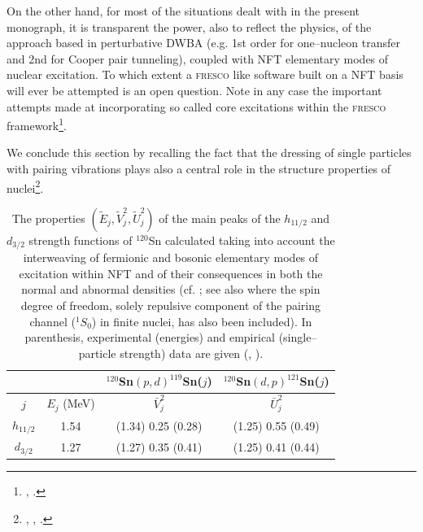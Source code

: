   
  On the other hand, for most of the situations dealt with in the present monograph, it is transparent the power, also to reflect the physics, of the approach based in perturbative DWBA (e.g. 1st order for one--nucleon transfer and 2nd for Cooper pair tunneling), coupled  
  with NFT elementary modes of nuclear excitation.
  To which extent a \textsc{fresco} like software built on a NFT basis will ever be attempted is an open question. Note in any case the important attempts made at incorporating so called core excitations within the \textsc{fresco} framework\footnote{\cite{Fernandez:10}, \cite{Fernandez:10b}.}. 
  
  
  We conclude this section by recalling the fact that the dressing of single particles with pairing vibrations plays also a central role in the structure properties of nuclei\footnote{\cite{Barranco:87b}, \cite{Bes:88}, \cite{Baroni:04}.}.
  
  
  \begin{table}
  \centering
  \begin{tabular}{|c|c|c|c|}
  \hline  &  & $^{120}$Sn$(p,d)^{119}$Sn($j$) & $^{120}$Sn$(d,p)^{121}$Sn($j$) \\ 
  \hline $j$ & $E_j$ (MeV) & $\bar V_j^2$ & $\bar U_j^2$ \\ 
  \hline $h_{11/2}$ & 1.54 &  (1.34) 0.25 (0.28) & (1.25) 0.55 (0.49) \\ 
  \hline $d_{3/2}$ & 1.27  & (1.27) 0.35 (0.41) & (1.25) 0.41 (0.44)  \\ 
  \hline 
  \end{tabular}\caption{The properties $(\tilde E_j,\tilde V^2_j, \tilde U_j^2)$ of the main peaks of the $h_{11/2}$ and $d_{3/2}$ strength functions of $^{120}$Sn calculated taking into account the interweaving of fermionic and bosonic elementary modes of excitation within NFT and of their consequences in both the normal and abnormal densities (cf. \cite{Idini:12}; \cite{Idini:13} see also \cite{Idini:15} where the spin degree of freedom, solely repulsive component of the pairing channel ($^1S_0$) in finite nuclei, has also been included). In parenthesis, experimental (energies) and empirical (single--particle strength) data are given (\cite{Bechara:75}, \cite{Dickey:82}).}\label{tab6.2.1}
  \end{table}

